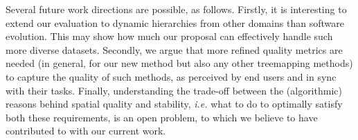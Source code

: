 Several future work directions are possible, as follows. Firstly, it is interesting to extend our evaluation to dynamic hierarchies from other domains than software evolution. This may show how much our proposal can effectively handle such more diverse datasets. Secondly, we argue that more refined quality metrics are needed (in general, for our new method but also any other treemapping methods) to capture the quality of such methods, as perceived by end users and in sync with their tasks. Finally, understanding the trade-off between the (algorithmic) reasons behind spatial quality and stability, \emph{i.e.} what to do to optimally satisfy both these requirements, is an open problem, to which we believe to have contributed to with our current work.
